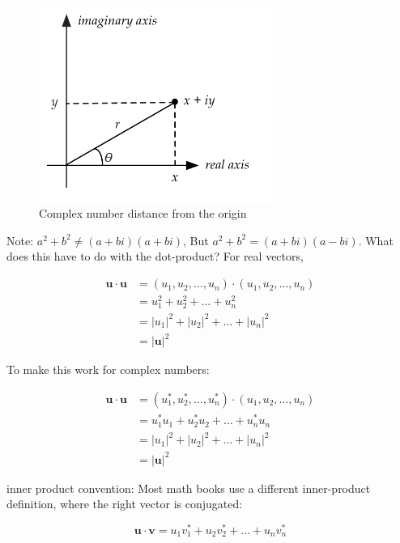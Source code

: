 \documentclass[main.tex]{subfiles}
\begin{document}
    \begin{figure}
        \centering
        \includegraphics[width=3in]{notes/figs/n04/03complexnumber.png}
        \caption{Complex number distance from the origin}
        \label{fig:03complexnumber2}
    \end{figure}
    
    Note: $a^{2}+b^{2} \neq(a+b i)(a+b i)$, But $a^{2}+b^{2}=(a+b i)(a-b i)$. What does this have to do with the dot-product? For real vectors,
    
    $$
    \begin{aligned}
    \mathbf{u} \cdot \mathbf{u} &=\left(u_{1}, u_{2}, \ldots, u_{n}\right) \cdot\left(u_{1}, u_{2}, \ldots, u_{n}\right) \\
    &=u_{1}^{2}+u_{2}^{2}+\ldots+u_{n}^{2} \\
    &=\left|u_{1}\right|^{2}+\left|u_{2}\right|^{2}+\ldots+\left|u_{n}\right|^{2} \\
    &=|\mathbf{u}|^{2}
    \end{aligned}
    $$
    
    To make this work for complex numbers:
    
    $$
    \begin{aligned}
    \mathbf{u} \cdot \mathbf{u} &=\left(u_{1}^{*}, u_{2}^{*}, \ldots, u_{n}^{*}\right) \cdot\left(u_{1}, u_{2}, \ldots, u_{n}\right) \\
    &=u_{1}^{*} u_{1}+u_{2}^{*} u_{2}+\ldots+u_{n}^{*} u_{n} \\
    &=\left|u_{1}\right|^{2}+\left|u_{2}\right|^{2}+\ldots+\left|u_{n}\right|^{2} \\
    &=|\mathbf{u}|^{2}
    \end{aligned}
    $$
    
    inner product convention: Most math books use a different inner-product definition, where the right vector is conjugated:
    
    $$
    \mathbf{u} \cdot \mathbf{v}=u_{1} v_{1}^{*}+u_{2} v_{2}^{*}+\ldots+u_{n} v_{n}^{*}
    $$
    
\end{document}
